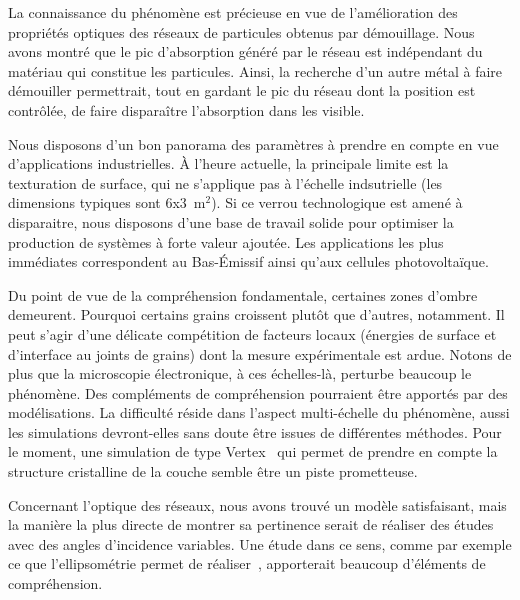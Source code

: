 La connaissance du phénomène est précieuse en vue de l'amélioration des propriétés optiques des réseaux de particules obtenus par démouillage. Nous avons montré que le pic d'absorption généré par le réseau est indépendant du matériau qui constitue les particules. Ainsi, la recherche d'un autre métal à faire démouiller permettrait, tout en gardant le pic du réseau dont la position est contrôlée, de faire disparaître l'absorption dans les visible.\par 
Nous disposons d'un bon panorama des paramètres à prendre en compte en vue d'applications industrielles. À l'heure actuelle, la principale limite est la texturation de surface, qui ne s'applique pas à l'échelle indsutrielle (les dimensions typiques sont 6x3~m$^2$). Si ce verrou technologique est amené à disparaitre, nous disposons d'une base de travail solide pour optimiser la production de systèmes à forte valeur ajoutée. Les applications les plus immédiates correspondent au Bas-Émissif ainsi qu'aux cellules photovoltaïque.\par 

\vspace{12pt}
Du point de vue de la compréhension fondamentale, certaines zones d'ombre demeurent. Pourquoi certains grains croissent plutôt que d'autres, notamment. Il peut s'agir d'une délicate compétition de facteurs locaux (énergies de surface et d'interface au joints de grains) dont la mesure expérimentale est ardue. Notons de plus que la microscopie électronique, à ces échelles-là, perturbe beaucoup le phénomène. Des compléments de compréhension pourraient être apportés par des modélisations. La difficulté réside dans l'aspect multi-échelle du phénomène, aussi les simulations devront-elles sans doute être issues de différentes méthodes. Pour le moment, une simulation de type Vertex~\cite{weygand1998vertex} qui permet de prendre en compte la structure cristalline de la couche semble être un piste prometteuse.\par 
Concernant l'optique des réseaux, nous avons trouvé un modèle satisfaisant, mais la manière la plus directe de montrer sa pertinence serait de réaliser des études avec des angles d'incidence variables. Une étude dans ce sens, comme par exemple ce que l'ellipsométrie permet de réaliser~\cite{brakstad2015dispersion}, apporterait beaucoup d'éléments de compréhension.\par  
\newpage



